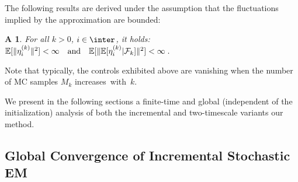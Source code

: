 \documentclass[conference,letterpaper]{IEEEtran}
\newtheorem{Lemma}{Lemma}
\newtheorem{assumption}{A\!\!}
\begin{document}
The following results are derived under the assumption that the fluctuations implied by the approximation are bounded:
\begin{assumption}\label{ass:mcerror}
For all $k >0$, $i \in \inter$, it holds: 
$\EE [\| \eta_{i}^{(k)}\|^2 ] < \infty \quad \textrm{and} \quad \EE[\| \EE[\eta_{i}^{(k)}|{\cal F}_k]\|^2] < \infty \eqs.$
\end{assumption}
Note that typically, the controls exhibited above are vanishing when the number of MC samples $M_k$ increases~with~$k$.

We present in the following sections a finite-time and global (independent of the initialization) analysis of both the incremental and two-timescale variants our method. 


\subsection{Global Convergence of Incremental Stochastic EM}
\end{document}
